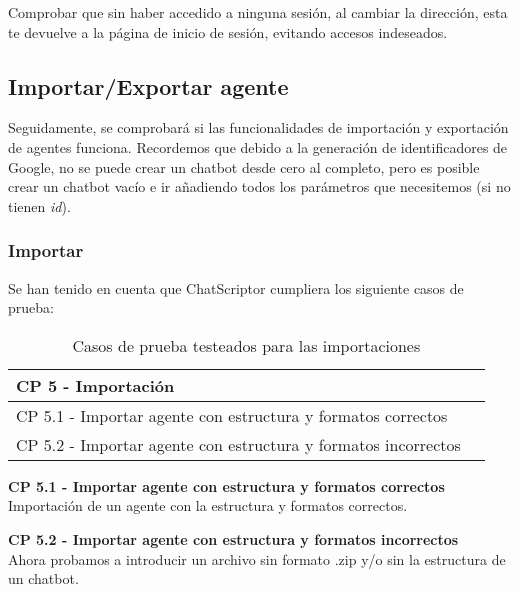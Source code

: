 Comprobar que sin haber accedido a ninguna sesión, al cambiar la dirección, esta te devuelve a la página de inicio de sesión, evitando accesos indeseados.

\subsection{Importar/Exportar agente}
Seguidamente, se comprobará si las funcionalidades de importación y exportación de agentes funciona. Recordemos que debido a la generación de identificadores de Google, no se puede crear un chatbot desde cero al completo, pero es posible crear un chatbot vacío e ir añadiendo todos los parámetros que necesitemos (si no tienen \textit{id}).

\subsubsection{Importar}
Se han tenido en cuenta que ChatScriptor cumpliera los siguiente casos de prueba:

\begin{table}[H]
\centering
\begin{tabular}{ll}
\toprule
CP 5 - Importación   \\
\midrule
CP 5.1 - Importar agente con estructura y formatos correctos   \\
CP 5.2 - Importar agente con estructura y formatos incorrectos \\
\bottomrule
\end{tabular}
\caption{Casos de prueba testeados para las importaciones}
\end{table}

\textbf{CP 5.1 - Importar agente con estructura y formatos correctos} \\
Importación de un agente con la estructura y formatos correctos.

\textbf{CP 5.2 - Importar agente con estructura y formatos incorrectos} \\
Ahora probamos a introducir un archivo sin formato .zip y/o sin la estructura de un chatbot.

